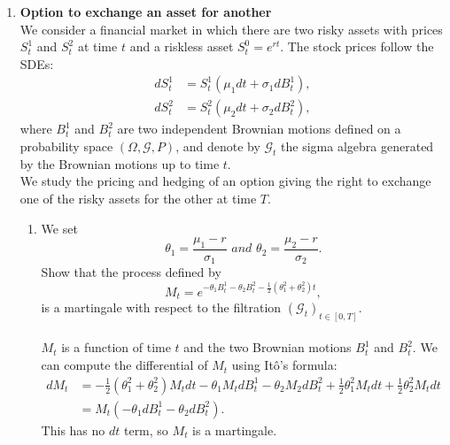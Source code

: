 \documentclass[11pt,a4,table]{article}
\begin{document}
\begin{enumerate}
    
    \item \textbf{Option to exchange an asset for another}\\
    We consider a financial market in which there are two risky assets with prices $S_t^1$ and $S_t^2$ at time $t$ and a riskless asset $S_t^0=e^{rt}$. The stock prices follow the SDEs:
    \begin{align*}
        dS_t^1 &= S_t^1(\mu_1 dt + \sigma_1 dB_t^1),\\
        dS_t^2 &= S_t^2(\mu_2 dt + \sigma_2 dB_t^2),
    \end{align*}
    where $B_t^1$ and $B_t^2$ are two independent Brownian motions defined on a probability space $(\Omega,\mathcal{G},P)$, and denote by $\mathcal{G}_t$ the sigma algebra generated by the Brownian motions up to time $t$.\\
    We study the pricing and hedging of an option giving the right to exchange one of the risky assets for the other at time $T$.
    
    \begin{enumerate}
        \item We set
        \begin{equation*}
            \theta_1=\frac{\mu_1 - r}{\sigma_1} \textit{ and } \theta_2=\frac{\mu_2 - r}{\sigma_2}.
        \end{equation*}
        Show that the process defined by
        \begin{equation*}
            M_t=e^{-\theta_1 B_t^1 -\theta_2 B_t^2 -\frac{1}{2}(\theta_1^2+\theta_2^2)t},
        \end{equation*}
        is a martingale with respect to the filtration $(\mathcal{G}_t)_{t\in[0, T]}$.\\\\
        $M_t$ is a function of time $t$ and the two Brownian motions $B_t^1$ and $B_t^2$. We can compute the differential of $M_t$ using Itô's formula:
        \begin{align*}
            dM_t &= -\frac{1}{2}(\theta_1^2 +\theta_2^2)M_t dt - \theta_1M_t dB_t^1 - \theta_2M_2dB_t^2 +\frac{1}{2}\theta_1^2M_t dt + \frac{1}{2}\theta_2^2M_t dt \\
            &= M_t(-\theta_1 dB_t^1 -\theta_2 dB_t^2).
        \end{align*}
        This has no $dt$ term, so $M_t$ is a martingale.
        

\end{enumerate}
\end{enumerate}
\end{document}
